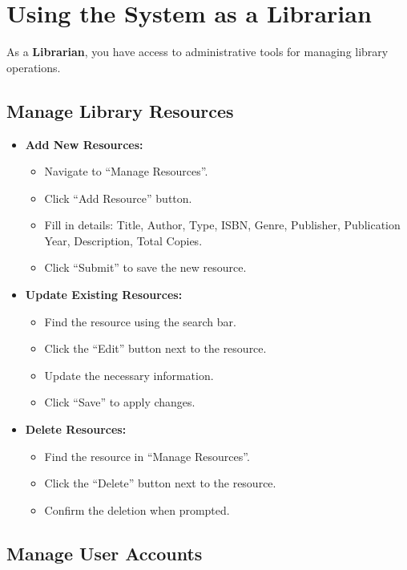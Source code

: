 \documentclass[11pt,a4paper]{article}
\begin{document}
\section{Using the System as a Librarian}

As a \textbf{Librarian}, you have access to administrative tools for managing library operations.

\subsection{Manage Library Resources}

\begin{itemize}
    \item \textbf{Add New Resources:}
    \begin{itemize}
        \item Navigate to ``Manage Resources''.
        \item Click ``Add Resource'' button.
        \item Fill in details: Title, Author, Type, ISBN, Genre, Publisher, Publication Year, Description, Total Copies.
        \item Click ``Submit'' to save the new resource.
    \end{itemize}

    \item \textbf{Update Existing Resources:}
    \begin{itemize}
        \item Find the resource using the search bar.
        \item Click the ``Edit'' button next to the resource.
        \item Update the necessary information.
        \item Click ``Save'' to apply changes.
    \end{itemize}

    \item \textbf{Delete Resources:}
    \begin{itemize}
        \item Find the resource in ``Manage Resources''.
        \item Click the ``Delete'' button next to the resource.
        \item Confirm the deletion when prompted.
    \end{itemize}
\end{itemize}

\subsection{Manage User Accounts}
\end{document}
